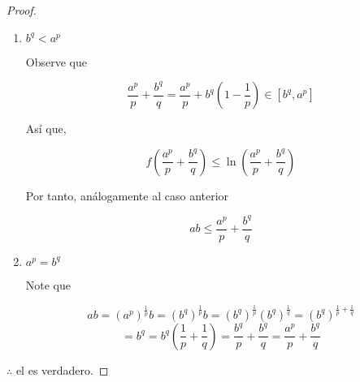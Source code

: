 \begin{proof}
\begin{enumerate}
\begin{center}
    \end{center}

        \item $b^q < a^p$

        Observe que 

        \begin{equation*}
            \frac{a^p}{p}+ \frac{b^q}{q} =  \frac{a^p}{p} + b^q \left( 1- \frac{1}{p} \right) \in [b^q,a^p]
        \end{equation*}

        Así que,

        \begin{equation*}
            f\left( \frac{a^p}{p}+ \frac{b^q}{q} \right) \leqslant \ln( \frac{a^p}{p}+ \frac{b^q}{q})
        \end{equation*}

        Por tanto, análogamente al caso anterior

        \begin{equation*}
            ab \leqslant \frac{a^p}{p}+ \frac{b^q}{q}
        \end{equation*}

        \item $a^p=b^q$

        Note que

        \begin{equation*}
            ab = {(a^p)}^{\frac{1}{p}}b = {(b^q)}^{\frac{1}{p}}b = {(b^q)}^{\frac{1}{p}}{(b^q)}^{\frac{1}{q}} = {(b^q)}^{\frac{1}{p}+\frac{1}{q}} 
        \end{equation*}
        \begin{equation*}
            =b^q = b^q \left(\frac{1}{p}+\frac{1}{q} \right) =   \frac{b^q}{p}+ \frac{b^q}{q}=  \frac{a^p}{p}+ \frac{b^q}{q}
        \end{equation*}
    \end{enumerate}

    $\therefore$ el  es verdadero.
\end{proof}

